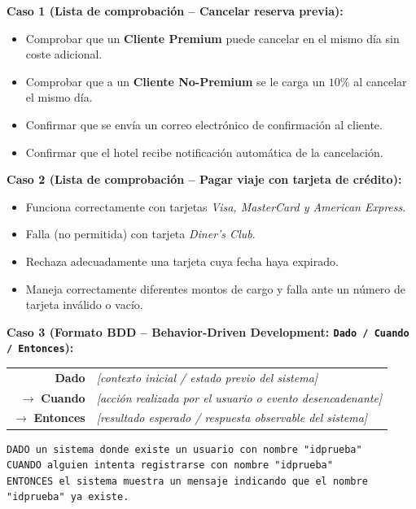 \begin{ejemplo}
\textbf{Caso 1 (Lista de comprobación -- Cancelar reserva previa):}
\begin{itemize}[itemsep=1pt]
    \item Comprobar que un \textbf{Cliente Premium} puede cancelar en el mismo día sin coste adicional.
    \item Comprobar que a un \textbf{Cliente No-Premium} se le carga un $10\%$ al cancelar el mismo día.
    \item Confirmar que se envía un correo electrónico de confirmación al cliente.
    \item Confirmar que el hotel recibe notificación automática de la cancelación.
\end{itemize}

\textbf{Caso 2 (Lista de comprobación -- Pagar viaje con tarjeta de crédito):}
\begin{itemize}[itemsep=1pt]
    \item Funciona correctamente con tarjetas \textit{Visa, MasterCard y American Express}.
    \item Falla (no permitida) con tarjeta \textit{Diner's Club}.
    \item Rechaza adecuadamente una tarjeta cuya fecha haya expirado.
    \item Maneja correctamente diferentes montos de cargo y falla ante un número de tarjeta inválido o vacío.
\end{itemize}

\textbf{Caso 3 (Formato BDD -- Behavior-Driven Development: \texttt{Dado / Cuando / Entonces}):}
\begin{center}
\small
\renewcommand{\arraystretch}{1.25}
\begin{tabular}{r l}
\textbf{\color{mdaGreen}Dado} & \textit{[contexto inicial / estado previo del sistema]} \\
$\boldsymbol{\longrightarrow}$ \textbf{\color{mdaGreen}Cuando} & \textit{[acción realizada por el usuario o evento desencadenante]} \\
$\boldsymbol{\longrightarrow}$ \textbf{\color{mdaGreen}Entonces} & \textit{[resultado esperado / respuesta observable del sistema]}
\end{tabular}
\end{center}
\begin{lstlisting}
DADO un sistema donde existe un usuario con nombre "idprueba"
CUANDO alguien intenta registrarse con nombre "idprueba"
ENTONCES el sistema muestra un mensaje indicando que el nombre "idprueba" ya existe.
\end{lstlisting}
\end{ejemplo}

